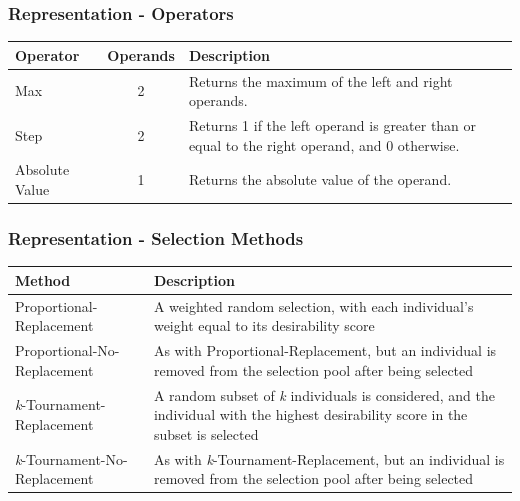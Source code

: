 \documentclass{beamer}
\begin{document}
	\begin{frame}
		\frametitle{Representation - Operators}
		
		\begin{table}
		\centering
		  \label{tab:gp-operators2}
		  \begin{tabular}{p{1.5cm}|c|p{6cm}}
			  \hline
			    \textbf{Operator} & \textbf{Operands} & \textbf{Description}\\
			    \hline
			    Max & 2 & Returns the maximum of the left and right operands.\\
			    \hline   
			    Step & 2 & Returns 1 if the left operand is greater than or equal to the right operand, and 0 otherwise.\\
			    \hline
			    Absolute Value & 1 & Returns the absolute value of the operand.\\    
			    \hline				    
                
		    
		\end{tabular}
		\end{table}		
	\end{frame}		
	
	\begin{frame}
		\frametitle{Representation - Selection Methods}
		
		\begin{table}
		\centering
		  \label{tab:selection-methods1}
		  \begin{tabular}{p{3cm}|p{7cm}}
		  \hline
		    \textbf{Method} & \textbf{Description}\\
			    \hline
			    Proportional-Replacement & A weighted random selection, with each individual's weight equal to its desirability score \\
			    \hline
			    Proportional-No-Replacement & As with Proportional-Replacement, but an individual is removed from the selection pool after being selected\\
			    \hline
			    \textit{k}-Tournament-Replacement& A random subset of \textit{k} individuals is considered, and the individual with the highest desirability score in the subset is selected \\
			    \hline
			    \textit{k}-Tournament-No-Replacement & As with \textit{k}-Tournament-Replacement, but an individual is removed from the selection pool after being selected\\
			    \hline
		\end{tabular}
		\end{table}		
	\end{frame}	
	
\end{document}
